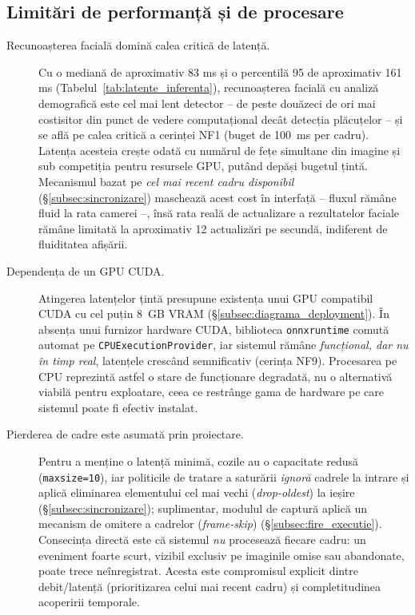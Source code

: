 \documentclass[../../main.tex]{subfiles}
\begin{document}
\subsection{Limitări de performanță și de procesare}

\begin{description}
	\item[Recunoașterea facială domină calea critică de latență.] Cu o mediană de \linebreak aproximativ 83 ms și o percentilă 95 de aproximativ 161 ms (Tabelul~\ref{tab:latente_inferenta}), recunoașterea facială cu analiză demografică este cel mai lent detector -- de peste douăzeci de ori mai costisitor din punct de vedere computațional decât detecția plăcuțelor -- și se află pe calea critică a cerinței NF1 (buget de 100~ms per cadru). Latența acesteia crește odată cu numărul de fețe simultane din imagine și sub competiția pentru resursele GPU, putând depăși bugetul țintă. Mecanismul bazat pe \emph{cel mai recent cadru disponibil} (\S\ref{subsec:sincronizare}) maschează acest cost în interfață -- fluxul rămâne fluid la rata camerei --, însă rata reală de actualizare a rezultatelor faciale rămâne limitată la aproximativ 12 actualizări pe secundă, indiferent de fluiditatea afișării.
	
	\item[Dependența de un GPU CUDA.] Atingerea latențelor țintă presupune existența unui GPU compatibil CUDA cu cel puțin 8~GB VRAM (\S\ref{subsec:diagrama_deployment}). În absența unui furnizor hardware CUDA, biblioteca \texttt{onnxruntime} comută automat pe \texttt{CPUExecutionProvider}, iar sistemul rămâne \emph{funcțional, dar nu în timp real}, latențele crescând semnificativ (cerința NF9). Procesarea pe CPU reprezintă astfel o stare de funcționare degradată, nu o alternativă viabilă pentru exploatare, ceea ce restrânge gama de hardware pe care sistemul poate fi efectiv instalat.
	
	\item[Pierderea de cadre este asumată prin proiectare.] Pentru a menține o latență minimă, cozile au o capacitate redusă (\texttt{maxsize=10}), iar politicile de tratare a saturării \emph{ignoră} cadrele la intrare și aplică eliminarea elementului cel mai vechi (\textit{drop-oldest}) la ieșire (\S\ref{subsec:sincronizare}); suplimentar, modulul de captură aplică un mecanism de omitere a cadrelor (\textit{frame-skip}) (\S\ref{subsec:fire_executie}). Consecința directă este că sistemul \emph{nu} procesează fiecare cadru: un eveniment foarte scurt, vizibil exclusiv pe imaginile omise sau abandonate, poate trece neînregistrat. Acesta este compromisul explicit dintre debit/latență (prioritizarea celui mai recent cadru) și completitudinea acoperirii temporale.
\end{description}
\end{document}
